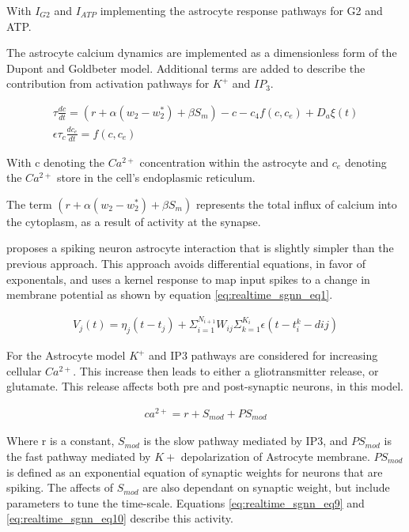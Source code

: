     With $I_{G2}$ and $I_{ATP}$ implementing the astrocyte response pathways for G2 and ATP.
    
    The astrocyte calcium dynamics are implemented as a dimensionless form of the Dupont and Goldbeter model. Additional terms are added to describe the contribution from activation pathways for $K^+$ and $IP_3$.
    
    \begin{align}
        \tau \frac{dc}{dt} = (r + \alpha(w_2 - w^*_2) + \beta S_m) - c - c_4 f(c, c_e) + D_a \xi(t) \\
        \epsilon \tau_c \frac{dc_e}{dt} = f(c, c_e)
    \end{align}
    
    With c denoting the $Ca^{2+}$ concentration within the astrocyte and $c_e$ denoting the $Ca^{2+}$ store in the cell's endoplasmic reticulum.
    
    The term $(r + \alpha(w_2 - w^*_2) + \beta S_m)$ represents the total influx of calcium into the cytoplasm, as a result of activity at the synapse.
    
    \cite{realtime_sgnn} proposes a spiking neuron astrocyte interaction that is slightly simpler than the previous approach. This approach avoids differential equations, in favor of exponentals, and uses a kernel response to map input spikes to a change in membrane potential as shown by equation \ref{eq:realtime_sgnn_eq1}.
    
    \begin{align}
        V_j(t) = \eta_j(t - t_j) + \Sigma^{N_{i+1}}_{i=1}W_{ij} \Sigma^{K_i}_{k=1} \epsilon(t - t_i^k - d{ij}) \label{eq:realtime_sgnn_eq1}
    \end{align}
    
    For the Astrocyte model $K^+$ and IP3 pathways are considered for increasing cellular $Ca^{2+}$. This increase then leads to either a gliotransmitter release, or glutamate. This release affects both pre and post-synaptic neurons, in this model.
    
    \begin{align}
        ca^{2+} = r + S_{mod} + PS_{mod}
    \end{align}
    
    Where r is a constant, $S_{mod}$ is the slow pathway mediated by IP3, and $PS_{mod}$ is the fast pathway mediated by $K+$ depolarization of Astrocyte membrane. $PS_{mod}$ is defined as an exponential equation of synaptic weights for neurons that are spiking. The affects of $S_{mod}$ are also dependant on synaptic weight, but include parameters to tune the time-scale. Equations \ref{eq:realtime_sgnn_eq9} and \ref{eq:realtime_sgnn_eq10} describe this activity.
    
